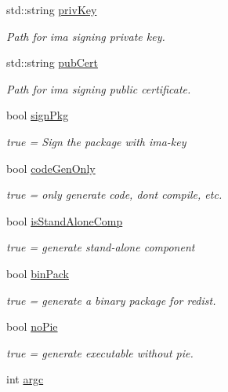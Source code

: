 \begin{DoxyCompactItemize}
std\+::string \hyperlink{structmk_1_1_build_params__t_a5da477f972859d313f97eb34a0eae0bf}{priv\+Key}
\begin{DoxyCompactList}\small\item\em Path for ima signing private key. \end{DoxyCompactList}\item 
std\+::string \hyperlink{structmk_1_1_build_params__t_a77859f79ebcc7c733ea4a451917a5b92}{pub\+Cert}
\begin{DoxyCompactList}\small\item\em Path for ima signing public certificate. \end{DoxyCompactList}\item 
bool \hyperlink{structmk_1_1_build_params__t_affd9f90b0dbc33d60621032075c3efe3}{sign\+Pkg}
\begin{DoxyCompactList}\small\item\em true = Sign the package with ima-\/key \end{DoxyCompactList}\item 
bool \hyperlink{structmk_1_1_build_params__t_a62f5299b57d9e1f2b4b7f9aa9abda5df}{code\+Gen\+Only}
\begin{DoxyCompactList}\small\item\em true = only generate code, don\textquotesingle{}t compile, etc. \end{DoxyCompactList}\item 
bool \hyperlink{structmk_1_1_build_params__t_a324442877f22ea53dc3ffd9a9a485f86}{is\+Stand\+Alone\+Comp}
\begin{DoxyCompactList}\small\item\em true = generate stand-\/alone component \end{DoxyCompactList}\item 
bool \hyperlink{structmk_1_1_build_params__t_ab0314a32f1aa7ee1d49b0fd3de3e5b33}{bin\+Pack}
\begin{DoxyCompactList}\small\item\em true = generate a binary package for redist. \end{DoxyCompactList}\item 
bool \hyperlink{structmk_1_1_build_params__t_a26f6bc40767d685542d66e19923f3614}{no\+Pie}
\begin{DoxyCompactList}\small\item\em true = generate executable without pie. \end{DoxyCompactList}\item 
int \hyperlink{structmk_1_1_build_params__t_ad75f63f97eceed858f47a0317b83f80b}{argc}

\end{DoxyCompactItemize}
